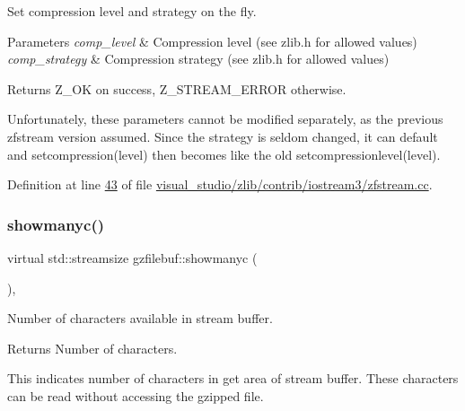 Set compression level and strategy on the fly. 


\begin{DoxyParams}{Parameters}
{\em comp\+\_\+level} & Compression level (see zlib.\+h for allowed values) \\
\hline
{\em comp\+\_\+strategy} & Compression strategy (see zlib.\+h for allowed values) \\
\hline
\end{DoxyParams}
\begin{DoxyReturn}{Returns}
Z\+\_\+\+OK on success, Z\+\_\+\+S\+T\+R\+E\+A\+M\+\_\+\+E\+R\+R\+OR otherwise.
\end{DoxyReturn}
Unfortunately, these parameters cannot be modified separately, as the previous zfstream version assumed. Since the strategy is seldom changed, it can default and setcompression(level) then becomes like the old setcompressionlevel(level). 

Definition at line \hyperlink{visual__studio_2zlib_2contrib_2iostream3_2zfstream_8cc_source_l00043}{43} of file \hyperlink{visual__studio_2zlib_2contrib_2iostream3_2zfstream_8cc_source}{visual\+\_\+studio/zlib/contrib/iostream3/zfstream.\+cc}.

\mbox{\label{classgzfilebuf_aa6c80a4f96fdc5e4a991113699428164}} 
\subsubsection{\texorpdfstring{showmanyc()}{showmanyc()}\hspace{0.1cm}{\footnotesize\ttfamily [1/2]}}
{\footnotesize\ttfamily virtual std\+::streamsize gzfilebuf\+::showmanyc (\begin{DoxyParamCaption}{ }\end{DoxyParamCaption})\hspace{0.3cm}{\ttfamily [protected]}, {\ttfamily [virtual]}}



Number of characters available in stream buffer. 

\begin{DoxyReturn}{Returns}
Number of characters.
\end{DoxyReturn}
This indicates number of characters in get area of stream buffer. These characters can be read without accessing the gzipped file. \mbox{\label{classgzfilebuf_afbe2418d8a9c3f4a321cc26aa4ae5f7a}} 
